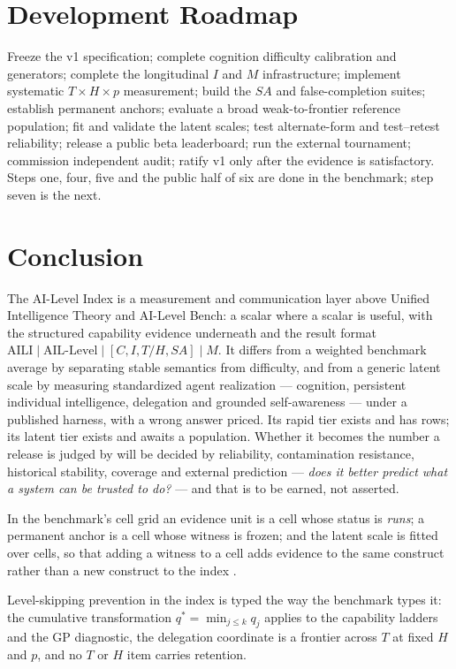 \section{Development Roadmap}\label{sec:roadmap}

Freeze the v1 specification; complete cognition difficulty calibration and generators; complete the longitudinal $I$ and $M$ infrastructure; implement systematic $T \times H \times p$ measurement; build the $SA$ and false-completion suites; establish permanent anchors; evaluate a broad weak-to-frontier reference population; fit and validate the latent scales; test alternate-form and test--retest reliability; release a public beta leaderboard; run the external tournament; commission independent audit; ratify v1 only after the evidence is satisfactory. Steps one, four, five and the public half of six are done in the benchmark; step seven is the next.

\section{Conclusion}

The AI-Level Index is a measurement and communication layer above Unified Intelligence Theory and AI-Level Bench: a scalar where a scalar is useful, with the structured capability evidence underneath and the result format $\mathrm{AILI} \mid \text{AIL-Level} \mid [C, I, T/H, SA] \mid M$. It differs from a weighted benchmark average by separating stable semantics from difficulty, and from a generic latent scale by measuring standardized agent realization --- cognition, persistent individual intelligence, delegation and grounded self-awareness --- under a published harness, with a wrong answer priced. Its rapid tier exists and has rows; its latent tier exists and awaits a population. Whether it becomes the number a release is judged by will be decided by reliability, contamination resistance, historical stability, coverage and external prediction --- \emph{does it better predict what a system can be trusted to do?} --- and that is to be earned, not asserted.

\appendix
In the benchmark's cell grid an evidence unit is a cell whose status is \emph{runs}; a permanent anchor is a cell whose witness is frozen; and the latent scale is fitted over cells, so that adding a witness to a cell adds evidence to the same construct rather than a new construct to the index \citep{yang2026hilbenchpaper}.

Level-skipping prevention in the index is typed the way the benchmark types it: the cumulative transformation $q^{*} = \min_{j \le k} q_j$ applies to the capability ladders and the GP diagnostic, the delegation coordinate is a frontier across $T$ at fixed $H$ and $p$, and no $T$ or $H$ item carries retention.

